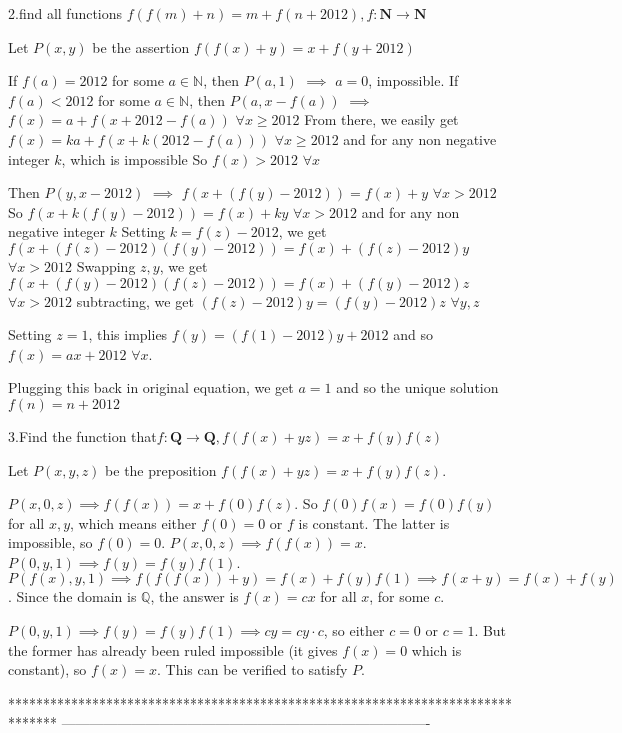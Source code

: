\begin{solution}
	\begin{tcolorbox}2.find all functions $ f(f(m)+n)=m+f(n+2012),f:\mathbf{N}\rightarrow \mathbf{N}$\end{tcolorbox}
Let $P(x,y)$ be the assertion $f(f(x)+y)=x+f(y+2012)$

If $f(a)=2012$ for some $a\in\mathbb N$, then $P(a,1)$ $\implies$ $a=0$, impossible.
If $f(a)<2012$ for some $a\in\mathbb N$, then $P(a,x-f(a))$ $\implies$ $f(x)=a+f(x+2012-f(a))$ $\forall x\ge 2012$
From there, we easily get $f(x)=ka+f(x+k(2012-f(a)))$ $\forall x\ge 2012$ and for any non negative integer $k$, which is impossible
So $f(x)>2012$ $\forall x$

Then $P(y,x-2012)$ $\implies$ $f(x+(f(y)-2012))=f(x)+y$ $\forall x>2012$
So $f(x+k(f(y)-2012))=f(x)+ky$ $\forall x>2012$ and for any non negative integer $k$
Setting $k=f(z)-2012$, we get $f(x+(f(z)-2012)(f(y)-2012))=f(x)+(f(z)-2012)y$ $\forall x>2012$
Swapping $z,y$, we get $f(x+(f(y)-2012)(f(z)-2012))=f(x)+(f(y)-2012)z$ $\forall x>2012$
subtracting, we get $(f(z)-2012)y=(f(y)-2012)z$ $\forall y,z$

Setting $z=1$, this implies $f(y)=(f(1)-2012)y+2012$ and so $f(x)=ax+2012$ $\forall x$.

Plugging this back in original equation, we get $a=1$ and so the unique solution $\boxed{f(n)=n+2012}$
\end{solution}



\begin{solution}
	3.Find the function that$f:\mathbf{Q}\rightarrow \mathbf{Q},f(f(x)+yz)=x+f(y)f(z)$
\end{solution}



\begin{solution}
	Let $P(x,y,z)$ be the preposition $f(f(x)+yz) = x + f(y)f(z)$.

$P(x,0,z) \implies f(f(x)) = x + f(0)f(z)$. So $f(0)f(x) = f(0)f(y)$ for all $x,y$, which means either $f(0) = 0$ or $f$ is constant. The latter is impossible, so $f(0) = 0$.
$P(x,0,z) \implies f(f(x)) = x$.
$P(0,y,1) \implies f(y) = f(y)f(1)$.
$P(f(x),y,1) \implies f(f(f(x))+y) = f(x) + f(y)f(1) \implies f(x+y) = f(x) + f(y)$. Since the domain is $\mathbb{Q}$, the answer is $f(x) = cx$ for all $x$, for some $c$.

$P(0,y,1) \implies f(y) = f(y)f(1) \implies cy = cy \cdot c$, so either $c = 0$ or $c = 1$. But the former has already been ruled impossible (it gives $f(x) = 0$ which is constant), so $f(x) = x$. This can be verified to satisfy $P$.
\end{solution}
*******************************************************************************
-------------------------------------------------------------------------------

